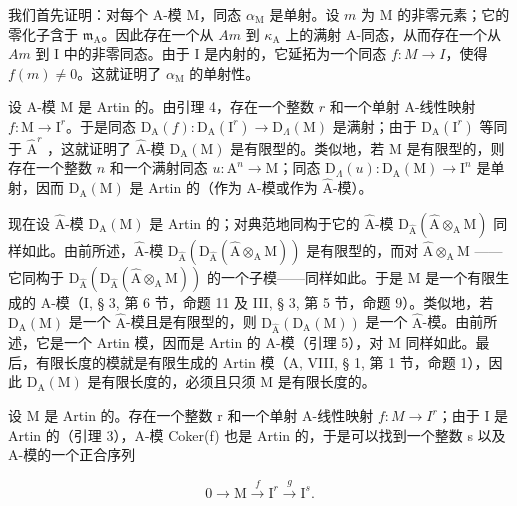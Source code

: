 我们首先证明：对每个 A-模 M，同态 \(\alpha_{\mathrm{M}}\) 是单射。设 \(m\) 为 M 的非零元素；它的零化子含于 \(\mathfrak{m}_{\mathrm{A}}\)。因此存在一个从 \(Am\) 到 \(\kappa_{\mathrm{A}}\) 上的满射 A-同态，从而存在一个从 \(Am\) 到 I 中的非零同态。由于 I 是内射的，它延拓为一个同态 \(f:M\to I\)，使得 \(f(m)\neq0\)。这就证明了 \(\alpha_{\mathrm{M}}\) 的单射性。

设 A-模 M 是 Artin 的。由引理 4，存在一个整数 \(r\) 和一个单射 A-线性映射 \(f: \mathrm{M} \to \mathrm{I}^r\)。于是同态 \(\mathrm{D}_{\mathrm{A}}(f): \mathrm{D}_{\mathrm{A}}(\mathrm{I}^r) \longrightarrow \mathrm{D}_{\Lambda}(\mathrm{M})\) 是满射；由于 \(\mathrm{D}_{\mathrm{A}}(\mathrm{I}^r)\) 等同于 \(\widehat{\mathrm{A}}^r\) ，这就证明了 \(\widehat{\mathrm{A}}\)-模 \(\mathrm{D}_{\mathrm{A}}(\mathrm{M})\) 是有限型的。类似地，若 M 是有限型的，则存在一个整数 \(n\) 和一个满射同态 \(u: \mathrm{A}^n \to \mathrm{M}\)；同态 \(\mathrm{D}_{\Lambda}(u): \mathrm{D}_{\mathrm{A}}(\mathrm{M}) \to \mathrm{I}^n\) 是单射，因而 \(\mathrm{D}_{\mathrm{A}}(\mathrm{M})\) 是 Artin 的（作为 A-模或作为 \(\widehat{\mathrm{A}}\)-模）。

现在设 \(\widehat{\mathrm{A}}\)-模 \(\mathrm{D}_{\mathrm{A}}(\mathrm{M})\) 是 Artin 的；对典范地同构于它的 \(\widehat{\mathrm{A}}\)-模 \(\mathrm{D}_{\widehat{\mathrm{A}}}(\widehat{\mathrm{A}} \otimes_{\mathrm{A}} \mathrm{M})\) 同样如此。由前所述，\(\widehat{\mathrm{A}}\)-模 \(\mathrm{D}_{\widehat{\mathrm{A}}}(\mathrm{D}_{\widehat{\mathrm{A}}}(\widehat{\mathrm{A}} \otimes_{\mathrm{A}} \mathrm{M}))\) 是有限型的，而对 \(\widehat{\mathrm{A}} \otimes_{\mathrm{A}} \mathrm{M}\) ——它同构于 \(\mathrm{D}_{\widehat{\mathrm{A}}}(\mathrm{D}_{\widehat{\mathrm{A}}}(\widehat{\mathrm{A}} \otimes_{\mathrm{A}} \mathrm{M}))\) 的一个子模——同样如此。于是 M 是一个有限生成的 A-模（I, § 3, 第 6 节，命题 11 及 III, § 3, 第 5 节，命题 9）。类似地，若 \(\mathrm{D}_{\mathrm{A}}(\mathrm{M})\) 是一个 \(\widehat{\mathrm{A}}\)-模且是有限型的，则 \(\mathrm{D}_{\widehat{\mathrm{A}}}(\mathrm{D}_{\mathrm{A}}(\mathrm{M}))\) 是一个 \(\widehat{\mathrm{A}}\)-模。由前所述，它是一个 Artin 模，因而是 Artin 的 A-模（引理 5），对 M 同样如此。最后，有限长度的模就是有限生成的 Artin 模（A, VIII, § 1, 第 1 节，命题 1），因此 \(\mathrm{D}_{\mathrm{A}}(\mathrm{M})\) 是有限长度的，必须且只须 M 是有限长度的。

设 M 是 Artin 的。存在一个整数 r 和一个单射 A-线性映射 \(f : M \to I^{r}\)；由于 I 是 Artin 的（引理 3），A-模 Coker(f) 也是 Artin 的，于是可以找到一个整数 s 以及 A-模的一个正合序列

\[
0 \to \mathrm{M} \stackrel {f} {\longrightarrow} \mathrm{I} ^ {r} \stackrel {g} {\longrightarrow} \mathrm{I} ^ {s}.
\]

